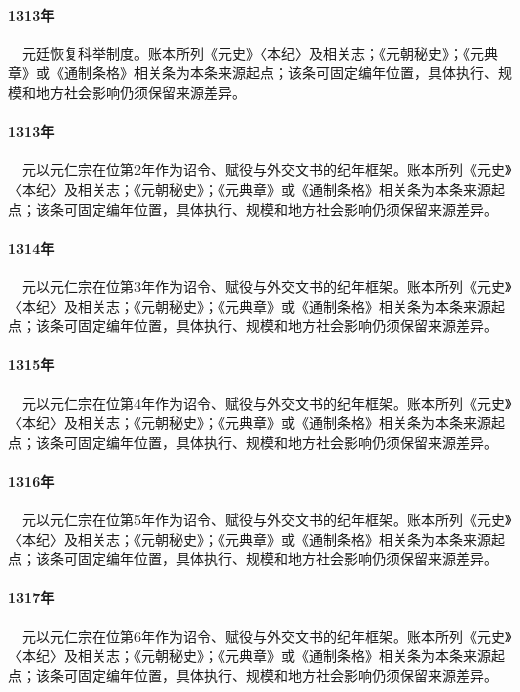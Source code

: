 \paragraph{1313年}　元廷恢复科举制度。账本所列《元史》〈本纪〉及相关志；《元朝秘史》；《元典章》或《通制条格》相关条为本条来源起点；该条可固定编年位置，具体执行、规模和地方社会影响仍须保留来源差异。

\paragraph{1313年}　元以元仁宗在位第2年作为诏令、赋役与外交文书的纪年框架。账本所列《元史》〈本纪〉及相关志；《元朝秘史》；《元典章》或《通制条格》相关条为本条来源起点；该条可固定编年位置，具体执行、规模和地方社会影响仍须保留来源差异。

\paragraph{1314年}　元以元仁宗在位第3年作为诏令、赋役与外交文书的纪年框架。账本所列《元史》〈本纪〉及相关志；《元朝秘史》；《元典章》或《通制条格》相关条为本条来源起点；该条可固定编年位置，具体执行、规模和地方社会影响仍须保留来源差异。

\paragraph{1315年}　元以元仁宗在位第4年作为诏令、赋役与外交文书的纪年框架。账本所列《元史》〈本纪〉及相关志；《元朝秘史》；《元典章》或《通制条格》相关条为本条来源起点；该条可固定编年位置，具体执行、规模和地方社会影响仍须保留来源差异。

\paragraph{1316年}　元以元仁宗在位第5年作为诏令、赋役与外交文书的纪年框架。账本所列《元史》〈本纪〉及相关志；《元朝秘史》；《元典章》或《通制条格》相关条为本条来源起点；该条可固定编年位置，具体执行、规模和地方社会影响仍须保留来源差异。

\paragraph{1317年}　元以元仁宗在位第6年作为诏令、赋役与外交文书的纪年框架。账本所列《元史》〈本纪〉及相关志；《元朝秘史》；《元典章》或《通制条格》相关条为本条来源起点；该条可固定编年位置，具体执行、规模和地方社会影响仍须保留来源差异。

